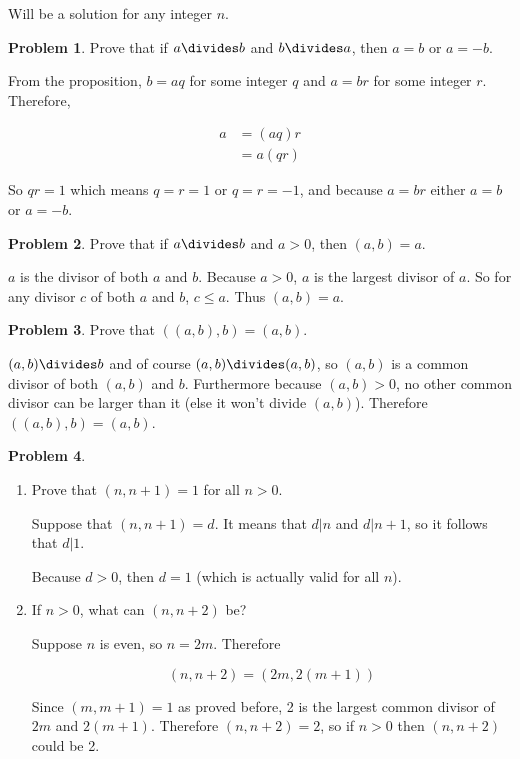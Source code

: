 \documentclass{article}
\theoremstyle{definition}
\newtheorem{problem}{Problem}[section]
\begin{document}
  Will be a solution for any integer $n$.
  
  \begin{problem}
  Prove that if $a \divides b$ and $b \divides a$, then $a = b$ or $a = -b$.
  \end{problem}
  
  From the proposition, $b = aq$ for some integer $q$ and $a = br$ for some integer $r$.
  Therefore,
  
  \begin{align*}
    a &= (aq)r \\
    &= a(qr)
  \end{align*}
  
  So $qr = 1$ which means $q = r = 1$ or $q = r = -1$, and because $a = br$ either
  $a = b$ or $a = -b$.
  
  \begin{problem}
    Prove that if $a \divides b$ and $a > 0$, then $(a, b) = a$.
  \end{problem}
  
  $a$ is the divisor of both $a$ and $b$. Because $a > 0$, $a$ is the largest divisor of $a$.
  So for any divisor $c$ of both $a$ and $b$, $c \leq a$. Thus $(a, b) = a$.
  
  \begin{problem}
    Prove that $((a, b), b) = (a, b)$.
  \end{problem}
  
  $(a, b) \divides b$ and of course $(a, b) \divides (a, b)$, so $(a, b)$ is a common divisor of both $(a, b)$ and $b$.
  Furthermore because $(a, b) > 0$, no other common divisor can be larger than it (else it won't divide $(a, b)$).
  Therefore $((a, b), b) = (a, b)$.
  
  \begin{problem}
    ~
  \end{problem}
  
  \begin{enumerate}[label=\alph*)]
      \item Prove that $(n, n + 1) = 1$ for all $n > 0$.
      
      Suppose that $(n, n + 1) = d$. It means that $d | n$ and $d | n + 1$, so it follows that $d | 1$.
  
      Because $d > 0$, then $d = 1$ (which is actually valid for all $n$).
      
      \item If $n > 0$, what can $(n, n + 2)$ be?
      
      Suppose $n$ is even, so $n = 2m$. Therefore
      
      \begin{equation*}
        (n, n + 2) = (2m, 2(m + 1))
      \end{equation*}
      
      Since $(m, m + 1) = 1$ as proved before, 2 is the largest common divisor of $2m$ and $2(m + 1)$.
      Therefore $(n, n + 2) = 2$, so if $n > 0$ then $(n, n + 2)$ could be 2.
  \end{enumerate}
    
\end{document}

